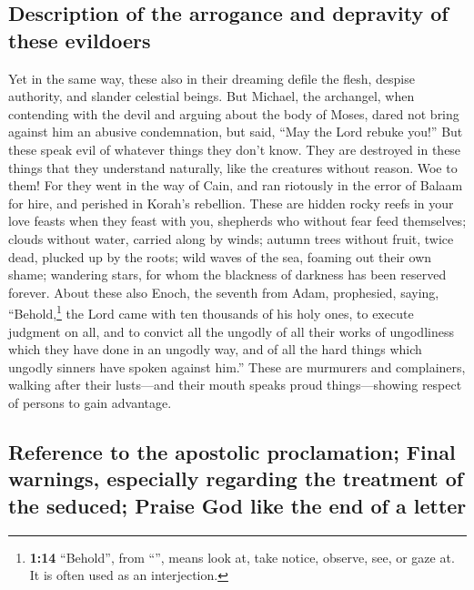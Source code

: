 \hypertarget{description-of-the-arrogance-and-depravity-of-these-evildoers}{%
\subsection{Description of the arrogance and depravity of these
evildoers}\label{description-of-the-arrogance-and-depravity-of-these-evildoers}}

 Yet in the same way, these also in their dreaming defile
the flesh, despise authority, and slander celestial beings.
 But Michael, the archangel, when contending with the
devil and arguing about the body of Moses, dared not bring against him
an abusive condemnation, but said, ``May the Lord rebuke you!''
 But these speak evil of whatever things they don't know.
They are destroyed in these things that they understand naturally, like
the creatures without reason.  Woe to them! For they went
in the way of Cain, and ran riotously in the error of Balaam for hire,
and perished in Korah's rebellion.  These are hidden
rocky reefs in your love feasts when they feast with you, shepherds who
without fear feed themselves; clouds without water, carried along by
winds; autumn trees without fruit, twice dead, plucked up by the roots;
 wild waves of the sea, foaming out their own shame;
wandering stars, for whom the blackness of darkness has been reserved
forever.  About these also Enoch, the seventh from Adam,
prophesied, saying, ``Behold,\footnote{\textbf{1:14} ``Behold'', from
  ``'', means look at, take notice, observe, see, or gaze
  at. It is often used as an interjection.} the Lord came with ten
thousands of his holy ones,  to execute judgment on all,
and to convict all the ungodly of all their works of ungodliness which
they have done in an ungodly way, and of all the hard things which
ungodly sinners have spoken against him.''  These are
murmurers and complainers, walking after their lusts---and their mouth
speaks proud things---showing respect of persons to gain advantage.

\hypertarget{reference-to-the-apostolic-proclamation-final-warnings-especially-regarding-the-treatment-of-the-seduced-praise-god-like-the-end-of-a-letter}{%
\subsection{Reference to the apostolic proclamation; Final warnings,
especially regarding the treatment of the seduced; Praise God like the
end of a
letter}\label{reference-to-the-apostolic-proclamation-final-warnings-especially-regarding-the-treatment-of-the-seduced-praise-god-like-the-end-of-a-letter}}

